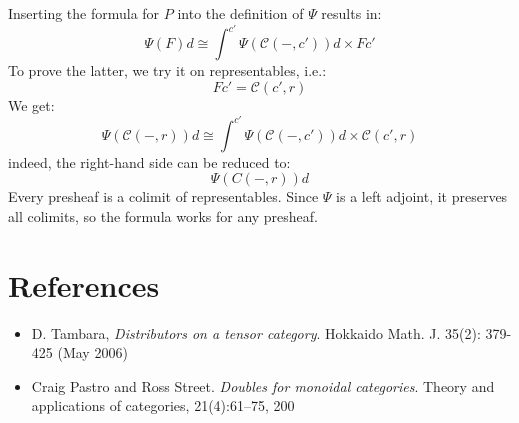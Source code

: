 \documentclass[11pt]{amsart}
\newcommand{\cat}[1]{\mathcal{#1}}%
\begin{document}
Inserting the formula for $P$ into the definition of $\Psi$ results in:
\[ \Psi (F) d \cong  \int^{c'} \Psi(\cat C(-, c')) d \times F c' \]
To prove the latter, we try it on representables, i.e.:
\[ F c' = \cat C (c', r) \]
We get:
\[ \Psi (\cat C(-, r)) d \cong \int^{c'} \Psi(\cat C(-, c')) d \times \cat C (c', r) \]
indeed, the right-hand side can be reduced to:
\[ \Psi (C(-, r)) d \]
Every presheaf is a colimit of representables. Since $\Psi$ is a left adjoint, it preserves all colimits, so the formula works for any presheaf.

\section{References}

\begin{itemize}
\item D. Tambara, \emph{Distributors on a tensor category}. Hokkaido Math. J. 35(2): 379-425 (May 2006)

\item Craig Pastro and Ross Street. \emph{Doubles for monoidal categories}. Theory and
applications of categories, 21(4):61–75, 200
\end{itemize}
\end{document}
